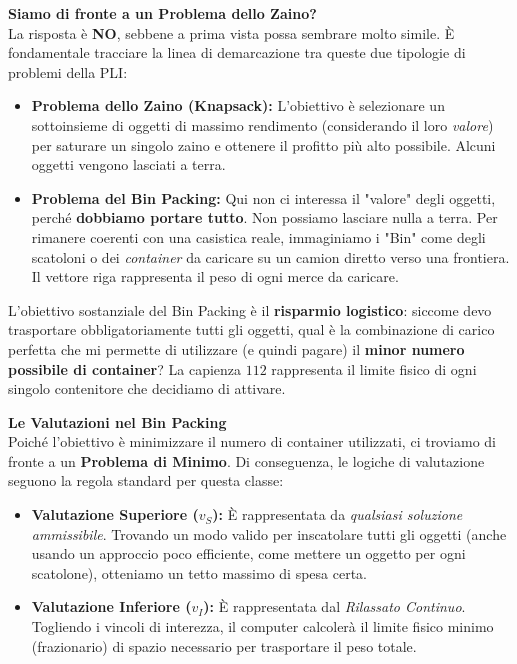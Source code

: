 \documentclass[12pt, a4paper]{article}
\begin{document}
	\vspace{0.4cm}
	\textbf{Siamo di fronte a un Problema dello Zaino?}\\
	La risposta è \textbf{NO}, sebbene a prima vista possa sembrare molto simile. 
	È fondamentale tracciare la linea di demarcazione tra queste due tipologie di problemi della PLI:
	\begin{itemize}[label=\textcolor{titlecolor}{\Large\textbullet}, itemsep=2pt, leftmargin=1.5cm]
		\item \textbf{Problema dello Zaino (Knapsack):} L'obiettivo è selezionare un sottoinsieme di oggetti di massimo rendimento (considerando il loro \textit{valore}) per saturare un singolo zaino e ottenere il profitto più alto possibile. Alcuni oggetti vengono lasciati a terra.
		\item \textbf{Problema del Bin Packing:} Qui non ci interessa il "valore" degli oggetti, perché \textbf{dobbiamo portare tutto}. Non possiamo lasciare nulla a terra. Per rimanere coerenti con una casistica reale, immaginiamo i "Bin" come degli scatoloni o dei \textit{container} da caricare su un camion diretto verso una frontiera. Il vettore riga rappresenta il peso di ogni merce da caricare.
	\end{itemize}
	
	L'obiettivo sostanziale del Bin Packing è il \textbf{risparmio logistico}: siccome devo trasportare obbligatoriamente tutti gli oggetti, qual è la combinazione di carico perfetta che mi permette di utilizzare (e quindi pagare) il \textbf{minor numero possibile di container}? La capienza $112$ rappresenta il limite fisico di ogni singolo contenitore che decidiamo di attivare.
	
	\vspace{0.4cm}
	\textbf{Le Valutazioni nel Bin Packing}\\
	Poiché l'obiettivo è minimizzare il numero di container utilizzati, ci troviamo di fronte a un \textbf{Problema di Minimo}. Di conseguenza, le logiche di valutazione seguono la regola standard per questa classe:
	\begin{itemize}[label=$\circ$, itemsep=2pt, leftmargin=1.5cm]
		\item \textbf{Valutazione Superiore ($v_S$):} È rappresentata da \textit{qualsiasi soluzione ammissibile}. Trovando un modo valido per inscatolare tutti gli oggetti (anche usando un approccio poco efficiente, come mettere un oggetto per ogni scatolone), otteniamo un tetto massimo di spesa certa.
		\item \textbf{Valutazione Inferiore ($v_I$):} È rappresentata dal \textit{Rilassato Continuo}. Togliendo i vincoli di interezza, il computer calcolerà il limite fisico minimo (frazionario) di spazio necessario per trasportare il peso totale.
	\end{itemize}
	
\end{document}
